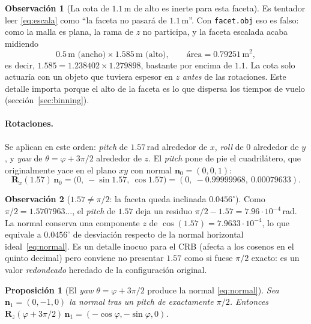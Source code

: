 \documentclass[11pt,a4paper]{article}
\newcommand{\vect}[1]{\boldsymbol{#1}}
\newcommand{\matr}[1]{\mathbf{#1}}
\newcommand{\code}[1]{\texttt{#1}}
\theoremstyle{definition}
\newtheorem{obs}{Observación}
\theoremstyle{plain}
\newtheorem{prop}{Proposición}
\begin{document}
\begin{obs}[La cota de $1.1\,$m de alto es inerte para esta faceta]
\label{obs:altura}
Es tentador leer \eqref{eq:escala} como \enquote{la faceta no pasará de
$1.1\,$m}. Con \code{facet.obj} eso es falso: como la malla es plana, la rama de
$z$ no participa, y la faceta escalada acaba midiendo
%
\[
0.5\,\text{m (ancho)} \times 1.585\,\text{m (alto)},
\qquad \text{área}=0.79251\,\text{m}^2,
\]
%
es decir, $1.585 = 1.238402\times1.279898$, bastante por encima de $1.1$. La
cota solo actuaría con un objeto que tuviera espesor en $z$ \emph{antes} de las
rotaciones. Este detalle importa porque el alto de la faceta es lo que dispersa
los tiempos de vuelo (sección~\ref{sec:binning}).
\end{obs}

\paragraph{Rotaciones.}
Se aplican en este orden: \emph{pitch} de $1.57\,$rad alrededor de $x$,
\emph{roll} de $0$ alrededor de $y$, y \emph{yaw} de
$\theta=\varphi+3\pi/2$ alrededor de $z$. El \emph{pitch} pone de pie el
cuadrilátero, que originalmente yace en el plano $xy$ con normal
$\vect n_0=(0,0,1)$:
%
\begin{equation}
\matr R_x(1.57)\,\vect n_0
=\bigl(0,\ -\sin 1.57,\ \cos 1.57\bigr)
=(0,\ -0.99999968,\ 0.00079633).
\end{equation}

\begin{obs}[$1.57 \ne \pi/2$: la faceta queda inclinada $0.0456^\circ$]
\label{obs:pitch157}
Como $\pi/2 = 1.5707963\ldots$, el \emph{pitch} de $1.57$ deja un residuo
$\pi/2-1.57 = 7.96\cdot10^{-4}\,$rad. La normal conserva una componente
$z$ de $\cos(1.57)=7.9633\cdot10^{-4}$, lo que equivale a
$0.0456^\circ$ de desviación respecto de la normal horizontal
ideal~\eqref{eq:normal}. Es un detalle inocuo para el CRB (afecta a los cosenos
en el quinto decimal) pero conviene no presentar $1.57$ como si fuese $\pi/2$
exacto: es un valor \emph{redondeado} heredado de la configuración original.
\end{obs}

\begin{prop}[El \emph{yaw} $\theta=\varphi+3\pi/2$ produce la normal
\eqref{eq:normal}]
\label{prop:yaw}
Sea $\vect n_1=(0,-1,0)$ la normal tras un \emph{pitch} de exactamente
$\pi/2$. Entonces $\matr R_z(\varphi+3\pi/2)\,\vect n_1 = (-\cos\varphi,
-\sin\varphi, 0)$.
\end{prop}
\end{document}
